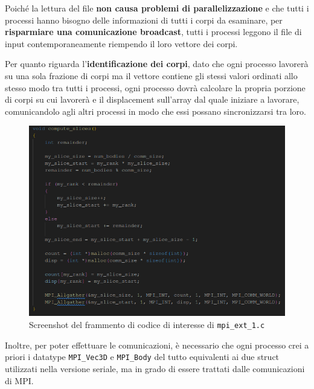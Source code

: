 \documentclass[12pt]{report}
\begin{document}
    Poiché la lettura del file \textbf{non causa problemi di parallelizzazione} e che tutti i processi hanno bisogno delle informazioni di tutti i corpi da esaminare, per \textbf{risparmiare una comunicazione broadcast}, tutti i processi leggono il file di input contemporaneamente riempendo il loro vettore dei corpi. 

    \newpage

    Per quanto riguarda l'\textbf{identificazione dei corpi}, dato che ogni processo lavorerà su una sola frazione di corpi ma il vettore contiene gli stessi valori ordinati allo stesso modo tra tutti i processi, ogni processo dovrà calcolare la propria porzione di corpi su cui lavorerà e il displacement sull'array dal quale iniziare a lavorare, comunicandolo agli altri processi in modo che essi possano sincronizzarsi tra loro.

    \begin{figure}[H]
        \centering
        \includegraphics[width=\textwidth]{images/mpi_ext_1_1.png}
        \caption{Screenshot del frammento di codice di interesse di \texttt{mpi\_ext\_1.c}}
        \label{fig:mpi_ext_1_1}
    \end{figure}

    Inoltre, per poter effettuare le comunicazioni, è necessario che ogni processo crei a priori i datatype \texttt{MPI\_Vec3D} e \texttt{MPI\_Body} del tutto equivalenti ai due struct utilizzati nella versione seriale, ma in grado di essere trattati dalle comunicazioni di MPI. 
\end{document}
